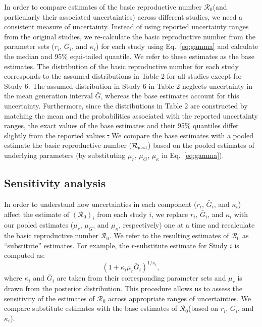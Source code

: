 \documentclass[12pt]{article}
\newcommand{\eref}[1]{Eq.~\ref{eq:#1}}
\newcommand{\Ro}{\ensuremath{{\mathcal R}_{0}}\xspace}
\newcommand{\Rpool}{\ensuremath{{\mathcal R}_{\textrm{\tiny{pool}}}}\xspace}
\providecommand{\DIFaddtex}[1]{{\protect\color{blue}\uwave{#1}}} %
\providecommand{\DIFdeltex}[1]{{\protect\color{red}\sout{#1}}}                      %
\providecommand{\DIFaddbegin}{} %
\providecommand{\DIFaddend}{} %
\providecommand{\DIFdelbegin}{} %
\providecommand{\DIFdelend}{} %
\providecommand{\DIFadd}[1]{\texorpdfstring{\DIFaddtex{#1}}{#1}} %
\providecommand{\DIFdel}[1]{\texorpdfstring{\DIFdeltex{#1}}{}} %
\newcommand{\DIFscaledelfig}{0.5}
\newlength{\DIFdelgraphicswidth} %
\newlength{\DIFdelgraphicsheight} %
\newcommand{\DIFaddincludegraphics}[2][]{{\color{blue}\fbox{\DIFOincludegraphics[#1]{#2}}}} %
\newcommand{\DIFdelincludegraphics}[2][]{%
\sbox{\DIFdelgraphicsbox}{\DIFOincludegraphics[#1]{#2}}%
\settoboxwidth{\DIFdelgraphicswidth}{\DIFdelgraphicsbox} %
\settoboxtotalheight{\DIFdelgraphicsheight}{\DIFdelgraphicsbox} %
\scalebox{\DIFscaledelfig}{%
\parbox[b]{\DIFdelgraphicswidth}{\usebox{\DIFdelgraphicsbox}\\[-\baselineskip] \rule{\DIFdelgraphicswidth}{0em}}\llap{\resizebox{\DIFdelgraphicswidth}{\DIFdelgraphicsheight}{%
\setlength{\unitlength}{\DIFdelgraphicswidth}%
\begin{picture}(1,1)%
\thicklines\linethickness{2pt} %
{\color[rgb]{1,0,0}\put(0,0){\framebox(1,1){}}}%
{\color[rgb]{1,0,0}\put(0,0){\line( 1,1){1}}}%
{\color[rgb]{1,0,0}\put(0,1){\line(1,-1){1}}}%
\end{picture}%
}\hspace*{3pt}}} %
} %
\DeclareRobustCommand{\DIFaddbegin}{\DIFOaddbegin \let\includegraphics\DIFaddincludegraphics} %
\DeclareRobustCommand{\DIFaddend}{\DIFOaddend \let\includegraphics\DIFOincludegraphics} %
\DeclareRobustCommand{\DIFdelbegin}{\DIFOdelbegin \let\includegraphics\DIFdelincludegraphics} %
\DeclareRobustCommand{\DIFdelend}{\DIFOaddend \let\includegraphics\DIFOincludegraphics} %
\begin{document}
In order to compare estimates of the basic reproductive number \Ro (and particularly their associated uncertainties) across different studies, we need a consistent measure of uncertainty.
Instead of using reported uncertainty ranges from the original studies, we re-calculate the basic reproductive number from the parameter sets ($r_i$, $\bar G_i$, and $\kappa_i$) for each study using \eref{gamma} and calculate the median and 95\% equi-tailed quantile.
We refer to these estimates as the base estimates.
The distribution of the basic reproductive number for each study corresponds to the assumed distributions in Table 2 for all studies except for Study 6.
The assumed distribution in Study 6 in Table 2 neglects uncertainty in the mean generation interval $\bar G$, whereas the base estimates account for this uncertainty.
Furthermore, since the distributions in Table 2 are constructed by matching the mean and the probabilities associated with the reported uncertainty ranges, the exact values of the base estimates and their 95\% quantiles differ slightly from the reported values \DIFdelbegin \DIFdel{.
}\DIFdelend \DIFaddbegin \DIFadd{in Table 1.
}\DIFaddend We compare the base estimates with a pooled estimate the basic reproductive number (\Rpool) based on the pooled estimates of underlying parameters (by substituting $\mu_r$, $\mu_G$, $\mu_\kappa$ in \eref{gamma}). 

\subsection{Sensitivity analysis}

In order to understand how uncertainties in each component ($r_i$, $\bar G_i$, and $\kappa_i$) affect the estimate of $(\Ro)_i$ from each study $i$, we replace $r_i$, $\bar G_i$, and $\kappa_i$ with our pooled estimates ($\mu_r$, $\mu_G$, and $\mu_\kappa$, respectively) one at a time and recalculate the basic reproductive number \Ro.
We refer to the resulting estimates of \Ro as ``substitute'' estimates.
For example, the $r$-substitute estimate for Study $i$ is computed as:
\begin{equation}
\left(1 + \kappa_i \mu_r \bar{G}_i\right)^{1/\kappa_i},
\end{equation}
where $\kappa_i$ and $\bar{G}_i$ are taken from their corresponding parameter sets and $\mu_r$ is drawn from the posterior distribution.
This procedure allows us to assess the sensitivity of the estimates of \Ro across appropriate ranges of uncertainties.
We compare substitute estimates with the base estimates of \Ro (based on $r_i$, $\bar G_i$, and $\kappa_i$).
\end{document}

